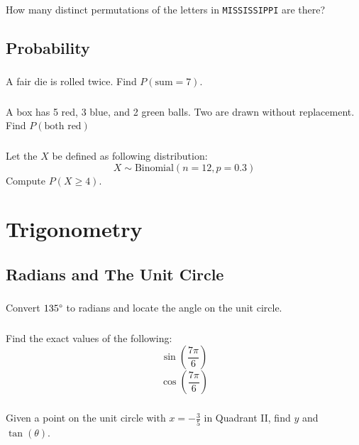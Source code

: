 \documentclass[12pt]{article}
\begin{document}
			\subsubsection{}
				How many distinct permutations of the letters in \texttt{MISSISSIPPI} are there?

		\subsection{Probability}
			\subsubsection{}
				A fair die is rolled twice. Find \(P(\text{sum}=7)\).
			\subsubsection{}
				A box has 5 red, 3 blue, and 2 green balls. Two are drawn without replacement. Find \(P(\text{both red})\)
			\subsubsection{}
				Let the \(X\) be defined as following distribution:
				\[X\sim \text{Binomial}(n=12,p=0.3)\]
				Compute \(P(X\ge4)\).

	\section{Trigonometry}
		\subsection{Radians and The Unit Circle}
			\subsubsection{}
				Convert \(135\degree\) to radians and locate the angle on the unit circle.
			\subsubsection{}
				Find the exact values of the following:
				\[\sin\left(\frac{7\pi}{6}\right)\]
				\[\cos\left(\frac{7\pi}{6}\right)\]
			\subsubsection{}
				Given a point on the unit circle with \(x=-\frac{3}{5}\) in Quadrant II, find \(y\) and \(\tan\left(\theta\right)\).
\end{document}
